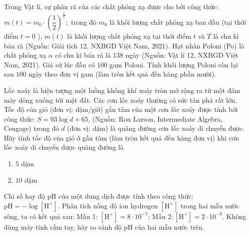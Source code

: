 \begin{vd}%
	Trong Vật lí, sự phân rã của các chất phóng xạ được cho bởi công thức: $m(t)=m_0 \cdot\left(\dfrac{1}{2}\right)^{\tfrac{t}{T}} ;$ trong đó $m_0$ là khối lượng chất phóng xạ ban đầu (tại thời điểm $t=0$ ), $m(t)$ là khối lượng chất phóng xạ tại thời điểm $t$ và $T$ là chu kì bán rã (Nguồn: Giải tích 12, NXBGD Việt Nam, 2021). Hạt nhân Poloni (Po) là chất phóng xạ $\alpha$ có chu kì bán rã là $138$ ngày (Nguồn: Vật lí 12, NXBGD Việt Nam, 2021). Giả sử lúc đầu có $100$ gam Poloni. Tính khối lượng Poloni còn lại sau $100$ ngày theo đơn vị gam (làm tròn kết quả đến hàng phần mười).
\end{vd}
\begin{vd}%
	Lốc xoáy là hiện tượng một luồng không khí xoáy tròn mở rộng ra từ một đám mây dông xuống tới mặt đất. Các cơn lốc xoáy thường có sức tàn phá rất lớn. Tốc độ của gió (đơn vị: dặm/giờ) gần tâm của một cơn lốc xoáy được tính bởi công thức: $S=93 \log d+65$, (Nguồn: Ron Larson, Intermediate Algebra, Cengage) trong đó $d$ (đơn vị: dặm) là quãng đường cơn lốc xoáy di chuyển được. Hãy tính tốc độ của gió ở gần tâm (làm tròn kết quả đến hàng đơn vị) khi cơn lốc xoáy di chuyển được quãng đường là
	\begin{multicols}{2}
		\begin{enumerate}
			\item $5$ dặm
			\item $10$ dặm
		\end{enumerate}
	\end{multicols}
\end{vd}
\begin{vd}%
	Chỉ số hay độ pH của một dung dịch được tính theo công thức: $\mathrm{pH}=-\log \left[\mathrm{H}^{+}\right]$. Phân tích nồng độ ion hydrogen $\left[\mathrm{H}^{+}\right]$ trong hai mẫu nước sông, ta có kết quả sau: Mẫu 1: $\left[\mathrm{H}^{+}\right]=8 \cdot 10^{-7}$; Mẫu $2:\left[\mathrm{H}^{+}\right]=2 \cdot 10^{-9}$.
	Không dùng máy tính cầm tay, hãy so sánh độ pH của hai mẫu nước trên.
\end{vd}

